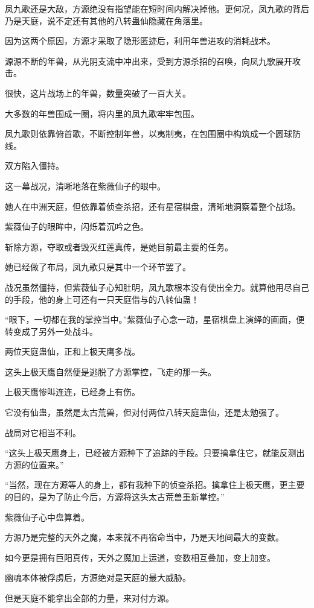 \begin{this_body}
凤九歌还是大敌，方源绝没有指望能在短时间内解决掉他。更何况，凤九歌的背后乃是天庭，说不定还有其他的八转蛊仙隐藏在角落里。

因为这两个原因，方源才采取了隐形匿迹后，利用年兽进攻的消耗战术。

源源不断的年兽，从光阴支流中冲出来，受到方源杀招的召唤，向凤九歌展开攻击。

很快，这片战场上的年兽，数量突破了一百大关。

大多数的年兽围成一圈，将内里的凤九歌牢牢包围。

凤九歌则依靠俯首歌，不断控制年兽，以夷制夷，在包围圈中构筑成一个圆球防线。

双方陷入僵持。

这一幕战况，清晰地落在紫薇仙子的眼中。

她人在中洲天庭，但依靠着侦查杀招，还有星宿棋盘，清晰地洞察着整个战场。

紫薇仙子的眼眸中，闪烁着沉吟之色。

斩除方源，夺取或者毁灭红莲真传，是她目前最主要的任务。

她已经做了布局，凤九歌只是其中一个环节罢了。

战况虽然僵持，但紫薇仙子心知肚明，凤九歌根本没有使出全力。就算他用尽自己的手段，他的身上可还有一只天庭借与的八转仙蛊！

“眼下，一切都在我的掌控当中。”紫薇仙子心念一动，星宿棋盘上演绎的画面，便转变成了另外一处战斗。

两位天庭蛊仙，正和上极天鹰多战。

这头上极天鹰自然便是逃脱了方源掌控，飞走的那一头。

上极天鹰惨叫连连，已经身上有伤。

它没有仙蛊，虽然是太古荒兽，但对付两位八转天庭蛊仙，还是太勉强了。

战局对它相当不利。

“这头上极天鹰身上，已经被方源种下了追踪的手段。只要擒拿住它，就能反测出方源的位置来。”

“当然，现在方源等人的身上，都有我种下的侦查杀招。擒拿住上极天鹰，更主要的目的，是为了防止今后，方源将这头太古荒兽重新掌控。”

紫薇仙子心中盘算着。

方源乃是完整的天外之魔，本来就不再宿命当中，乃是天地间最大的变数。

如今更是拥有巨阳真传，天外之魔加上运道，变数相互叠加，变上加变。

幽魂本体被俘虏后，方源绝对是天庭的最大威胁。

但是天庭不能拿出全部的力量，来对付方源。


\end{this_body}
